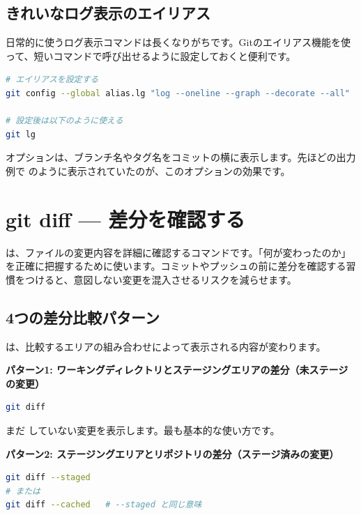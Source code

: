\subsection{きれいなログ表示のエイリアス}

日常的に使うログ表示コマンドは長くなりがちです。Gitのエイリアス機能を使って、短いコマンドで呼び出せるように設定しておくと便利です。

\begin{lstlisting}[language=bash]
# エイリアスを設定する
git config --global alias.lg "log --oneline --graph --decorate --all"

# 設定後は以下のように使える
git lg
\end{lstlisting}

 オプションは、ブランチ名やタグ名をコミットの横に表示します。先ほどの出力例で  のように表示されていたのが、このオプションの効果です。

\section{git diff — 差分を確認する}

 は、ファイルの変更内容を詳細に確認するコマンドです。「何が変わったのか」を正確に把握するために使います。コミットやプッシュの前に差分を確認する習慣をつけると、意図しない変更を混入させるリスクを減らせます。

\subsection{4つの差分比較パターン}

 は、比較するエリアの組み合わせによって表示される内容が変わります。

\textbf{パターン1: ワーキングディレクトリとステージングエリアの差分（未ステージの変更）}

\begin{lstlisting}[language=bash]
git diff
\end{lstlisting}

まだ  していない変更を表示します。最も基本的な使い方です。

\textbf{パターン2: ステージングエリアとリポジトリの差分（ステージ済みの変更）}

\begin{lstlisting}[language=bash]
git diff --staged
# または
git diff --cached   # --staged と同じ意味
\end{lstlisting}

